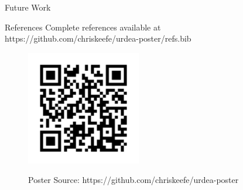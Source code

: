 \documentclass[final]{beamer}
\newlength{\sepwidth}
\newlength{\colwidth}
\newcommand{\separatorcolumn}{\begin{column}{\sepwidth}\end{column}}
\begin{document}
\begin{frame}[t]
\begin{columns}[t]
\begin{column}{\colwidth}
\begin{block}{Future Work}
  \end{block}

  \begin{block}{References}
    Complete references available at https://github.com/chriskeefe/urdea-poster/refs.bib

    \nocite{*}
    

  \end{block}

  \begin{figure}
    \begin{minipage}[c]{\textwidth}
      \hfill
      \includegraphics[height=5cm]{assets/repo}
    \end{minipage}
    \begin{minipage}[c]{\textwidth}
      \hfill
      Poster Source: https://github.com/chriskeefe/urdea-poster
    \end{minipage}
\end{figure}


\end{column}

\separatorcolumn
\end{columns}
\end{frame}
\end{document}

